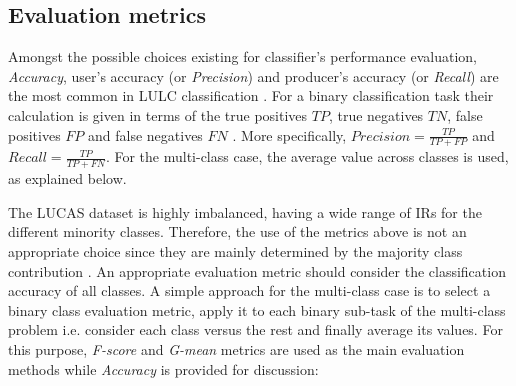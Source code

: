 \documentclass[remotesensing,article,submit,moreauthors,pdftex]{Definitions/mdpi}
\begin{document}
\subsection{Evaluation metrics}  \label{Evaluation metrics}

Amongst the possible choices existing for classifier's performance evaluation,
\textit{Accuracy}, user's accuracy (or \textit{Precision}) and
producer's accuracy (or \textit{Recall}) are the most common in LULC
classification \cite{Liu2007, Olofsson2013}. For a binary classification task
their calculation is given in terms of the true positives \( TP \), true
negatives \(TN \), false positives \( FP \) and false negatives \( FN \)
\cite{Liu2007}. More specifically,  \( \textit{Precision} =  \frac{TP}{TP + FP}
\) and \(\textit{Recall} =  \frac{TP}{TP + FN} \). For the multi-class case, the
average value across classes is used, as explained below.

The LUCAS dataset is highly imbalanced, having a wide range of IRs for the
different minority classes. Therefore, the use of the metrics above is not an
appropriate choice since they are mainly determined by the majority class
contribution \cite{He2009}. An appropriate evaluation metric should consider the
classification accuracy of all classes. A simple approach for the multi-class
case is to select a binary class evaluation metric, apply it to each binary
sub-task of the multi-class problem i.e. consider each class versus the rest and
finally average its values. For this purpose, \textit{F-score} and
\textit{G-mean} metrics are used as the main evaluation methods while
\textit{Accuracy} is provided for discussion:
\end{document}
